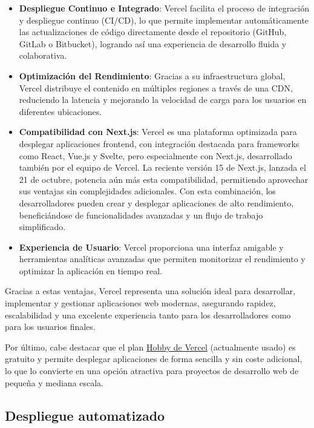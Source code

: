 \begin{itemize}
    \item \textbf{Despliegue Continuo e Integrado}: Vercel facilita el proceso de integración y despliegue continuo (CI/CD), lo que permite implementar automáticamente las actualizaciones de código directamente desde el repositorio (GitHub, GitLab o Bitbucket), logrando así una experiencia de desarrollo fluida y colaborativa.
    \item \textbf{Optimización del Rendimiento}: Gracias a su infraestructura global, Vercel distribuye el contenido en múltiples regiones a través de una CDN, reduciendo la latencia y mejorando la velocidad de carga para los usuarios en diferentes ubicaciones.
    \item \textbf{Compatibilidad con Next.js}: Vercel es una plataforma optimizada para desplegar aplicaciones frontend, con integración destacada para frameworks como React, Vue.js y Svelte, pero especialmente con Next.js, desarrollado también por el equipo de Vercel. La reciente versión 15 de Next.js, lanzada el 21 de octubre, potencia aún más esta compatibilidad, permitiendo aprovechar sus ventajas sin complejidades adicionales. Con esta combinación, los desarrolladores pueden crear y desplegar aplicaciones de alto rendimiento, beneficiándose de funcionalidades avanzadas y un flujo de trabajo simplificado.
    \item \textbf{Experiencia de Usuario}: Vercel proporciona una interfaz amigable y herramientas analíticas avanzadas que permiten monitorizar el rendimiento y optimizar la aplicación en tiempo real.
\end{itemize}

Gracias a estas ventajas, Vercel representa una solución ideal para desarrollar, implementar y gestionar aplicaciones web modernas, asegurando rapidez, escalabilidad y una excelente experiencia tanto para los desarrolladores como para los usuarios finales.

Por último, cabe destacar que el plan \href{https://vercel.com/docs/accounts/plans/hobby}{Hobby de Vercel} (actualmente usado) es gratuito y permite desplegar aplicaciones de forma sencilla y sin coste adicional, lo que lo convierte en una opción atractiva para proyectos de desarrollo web de pequeña y mediana escala.

\subsection{Despliegue automatizado}

